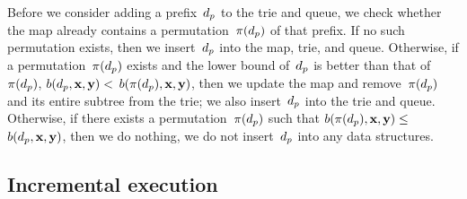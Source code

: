 Before we consider adding a prefix~$d_p$ to the trie and queue, we check
whether the map already contains a permutation~$\pi(d_p)$ of that prefix.
%
If no such permutation exists, then we insert~$d_p$ into the map, trie, and queue.
%
Otherwise, if a permutation~$\pi(d_p)$ exists and the lower bound of~$d_p$ is better
than that of~$\pi(d_p)$, \ie ${b(d_p, \mathbf{x}, \mathbf{y}) <}$ ${b(\pi(d_p), \mathbf{x}, \mathbf{y})}$,
then we update the map and remove~$\pi(d_p)$ and its entire subtree from the trie;
we also insert~$d_p$ into the trie and queue.
%
Otherwise, if there exists a permutation~$\pi(d_p)$ such that
${b(\pi(d_p), \mathbf{x}, \mathbf{y}) \le}$ ${b(d_p, \mathbf{x}, \mathbf{y})}$,
then we do nothing, \ie we do not insert~$d_p$ into any data structures.

\subsection{Incremental execution}
\label{sec:execution}


